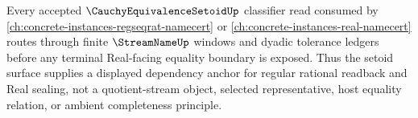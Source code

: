 \begin{theorem}
\label{thm:cauchy-equivalence-setoid-regseqrat-real-dependency-anchor}
Every accepted $\CauchyEquivalenceSetoidUp$ classifier read consumed by \autoref{ch:concrete-instances-regseqrat-namecert} or \autoref{ch:concrete-instances-real-namecert} routes through finite $\StreamNameUp$ windows and dyadic tolerance ledgers before any terminal Real-facing equality boundary is exposed. Thus the setoid surface supplies a displayed dependency anchor for regular rational readback and Real sealing, not a quotient-stream object, selected representative, host equality relation, or ambient completeness principle.
\end{theorem}
